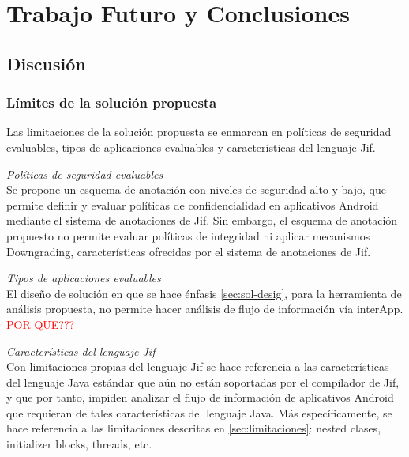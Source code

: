 \label{ch:trabajoFuturo}
\chapter{Trabajo Futuro y Conclusiones}
\section{Discusión}
\subsection{Límites de la solución propuesta}
Las limitaciones de la solución propuesta se enmarcan en políticas de seguridad
evaluables, tipos de aplicaciones evaluables y características del lenguaje Jif.

\emph{Políticas de seguridad evaluables}\\
Se propone un esquema de anotación con niveles de seguridad alto y
bajo, que permite definir y evaluar políticas de confidencialidad en aplicativos
Android mediante el sistema de anotaciones de Jif.
Sin embargo, el esquema de anotación propuesto no permite evaluar políticas de
integridad ni aplicar mecanismos Downgrading, características ofrecidas por el
sistema de anotaciones de Jif.

\emph{Tipos de aplicaciones evaluables}\\
El diseño de solución en que se hace énfasis \ref{sec:sol-desig}, para la
herramienta de análisis propuesta, no permite hacer análisis de flujo de
información vía interApp. \textcolor{red}{POR QUE???}

\emph{Características del lenguaje Jif}\\
Con limitaciones propias del lenguaje Jif se hace referencia a las
características del lenguaje Java estándar que aún no están soportadas por el
compilador de Jif, y que por tanto, impiden analizar el flujo de información de
aplicativos Android que requieran de tales características del lenguaje Java.
Más específicamente, se hace referencia a las limitaciones descritas en
\ref{sec:limitaciones}: nested clases, initializer blocks, threads, etc.

